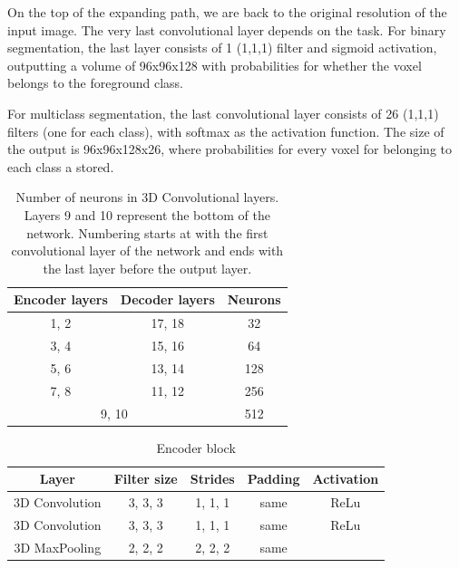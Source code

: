 On the top of the expanding path, we are back to the original resolution of the input image. The very last convolutional layer depends on the task. For binary segmentation, the last layer consists of 1 (1,1,1) filter and sigmoid activation, outputting a volume of 96x96x128 with probabilities for whether the voxel belongs to the foreground class.

For multiclass segmentation, the last convolutional layer consists of 26 (1,1,1) filters (one for each class), with softmax as the activation function. The size of the output is 96x96x128x26, where probabilities for every voxel for belonging to each class a stored. 


\begin{table}[]
\centering
\begin{tabular}{@{}ccc@{}}
\toprule
\multicolumn{1}{l}{Encoder layers} & \multicolumn{1}{l}{Decoder layers} & \multicolumn{1}{l}{Neurons} \\ \midrule
1, 2                               & 17, 18                             & 32                          \\
3, 4                               & 15, 16                             & 64                          \\
5, 6                               & 13, 14                             & 128                         \\
7, 8                               & 11, 12                             & 256                         \\
\multicolumn{2}{c}{9, 10}                                               & 512                         \\ \bottomrule
\end{tabular}
\caption[Number of neurons for each layer]{Number of neurons in 3D Convolutional layers. Layers 9 and 10 represent the bottom of the network. Numbering starts at with the first convolutional layer of the network and ends with the last layer before the output layer.}
\label{tab:neurons}
\end{table}


\begin{table}[]
\centering
\begin{tabular}{@{}ccccc@{}}
\toprule
Layer          & Filter size & Strides & Padding & Activation \\ \midrule
3D Convolution & 3, 3, 3     & 1, 1, 1 & same    & ReLu       \\
3D Convolution & 3, 3, 3     & 1, 1, 1 & same    & ReLu       \\
3D MaxPooling  & 2, 2, 2     & 2, 2, 2 & same    &            \\ \bottomrule
\end{tabular}
\caption{Encoder block}
\label{tab:encoder-block}
\end{table}

